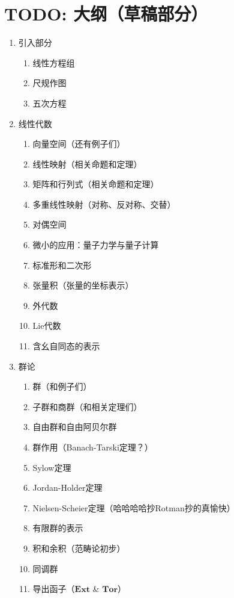 \documentclass[../main.tex]{subfiles}
\begin{document}
\chapter*{TODO: 大纲（草稿部分）}
\begin{multicols}{2}
\begin{enumerate}
    \item 引入部分
    \begin{enumerate}
        \item 线性方程组
        \item 尺规作图
        \item 五次方程
    \end{enumerate}
    \item 线性代数
    \begin{enumerate}
        \item 向量空间（还有例子们）
        \item 线性映射（相关命题和定理）
        \item 矩阵和行列式（相关命题和定理）
        \item 多重线性映射（对称、反对称、交替）
        \item 对偶空间
        \item 微小的应用：量子力学与量子计算
        \item 标准形和二次形
        \item 张量积（张量的坐标表示）
        \item 外代数
        \item Lie代数
        \item 含幺自同态的表示
    \end{enumerate}
    \item 群论
    \begin{enumerate}
        \item 群（和例子们）
        \item 子群和商群（和相关定理们）
        \item 自由群和自由阿贝尔群
        \item 群作用（Banach-Tarski定理？）
        \item Sylow定理
        \item Jordan-Holder定理
        \item Nielsen-Scheier定理（哈哈哈哈抄Rotman抄的真愉快）
        \item 有限群的表示
        \item 积和余积（范畴论初步）
        \item 同调群
        \item 导出函子（$\mathbf{Ext}$ \& $\mathbf{Tor}$）

\end{enumerate}
\end{enumerate}
\end{multicols}
\end{document}
